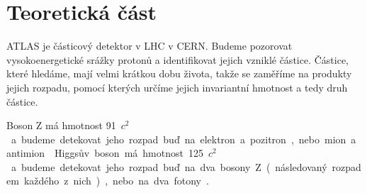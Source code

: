 \section*{Teoretická část}
ATLAS je částicový detektor v LHC v CERN. Budeme pozorovat vysokoenergetické srážky protonů a identifikovat jejich vzniklé částice.
Částice, které hledáme, mají velmi krátkou dobu života, takže se zaměříme na produkty jejich rozpadu, pomocí kterých určíme jejich invariantní hmotnost a tedy druh částice.

Boson Z má hmotnost \SI{91}{\GeV\per $c^2$} a budeme detekovat jeho rozpad buď na elektron a pozitron, nebo mion a antimion \cite{skripta}.

Higgsův boson má hmotnost \SI{125}{\GeV\per $c^2$} a budeme detekovat jeho rozpad buď na dva bosony Z (následovaný rozpadem každého z nich), nebo na dva fotony \cite{skripta}.

